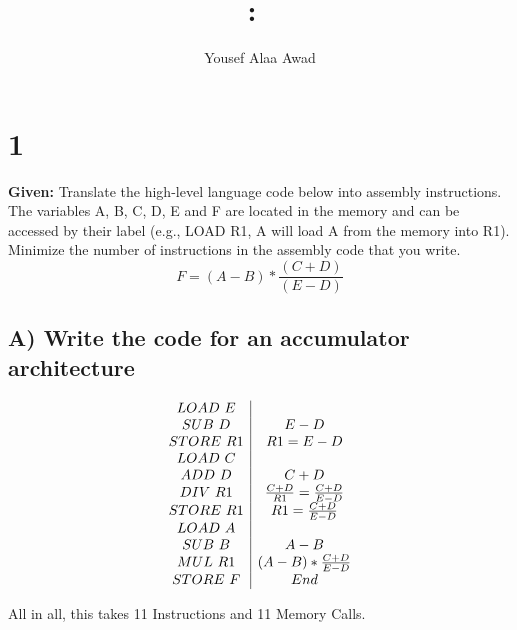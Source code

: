 \documentclass{article}
\title{
    \vspace{2in}
    \textmd{\textbf{\hmwkClass:\ \hmwkTitle}}\\
    \normalsize\vspace{0.1in}
    \vspace{3in}
}
\author{Yousef Alaa Awad}
\begin{document}
\maketitle
\pagebreak

\section{1}
\textbf{Given:} Translate the high-level language code below into assembly instructions. The variables A, B, C, D, E and F are located in the memory and can be accessed by their label (e.g., LOAD R1, A will load A from the memory into R1). Minimize the number of instructions in the assembly code that you write.
$$ F = (A-B)*\frac{(C+D)}{(E-D)} $$

\subsection{A) Write the code for an accumulator architecture}
\begin{centering}
  \begin{displaymath}
  \begin{array}{c | c}
		LOAD\ E  \\
		SUB\ D  & E - D \\
		STORE\ R1 & R1 = E - D\\
		LOAD\ C \\
		ADD\ D  & C + D\\
		DIV\ R1 & \frac{C+D}{R1} = \frac{C+D}{E-D} \\
		STORE\ R1 & R1 = \frac{C+D}{E-D} \\
		LOAD\ A  \\
		SUB\ B  & A - B \\
		MUL\ R1 & (A-B)*\frac{C+D}{E-D} \\
		STORE\ F & End\\
  \end{array}
  \end{displaymath}
\end{centering}
All in all, this takes 11 Instructions and 11 Memory Calls.
\end{document}
